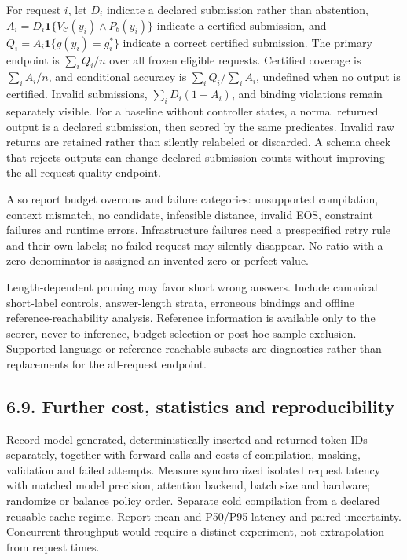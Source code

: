 \documentclass[
  12pt,
  a4paper,
]{article}
\begin{document}
For request $i$, let $D_i$ indicate a declared submission rather than abstention, $A_i=D_i\mathbf 1\{V_{\mathcal C}(y_i)\land P_b(y_i)\}$ indicate a certified submission, and $Q_i=A_i\mathbf 1\{g(y_i)=g_i^*\}$ indicate a correct certified submission. The primary endpoint is $\sum_i Q_i/n$ over all frozen eligible requests. Certified coverage is $\sum_i A_i/n$, and conditional accuracy is $\sum_i Q_i/\sum_i A_i$, undefined when no output is certified. Invalid submissions, $\sum_i D_i(1-A_i)$, and binding violations remain separately visible. For a baseline without controller states, a normal returned output is a declared submission, then scored by the same predicates. Invalid raw returns are retained rather than silently relabeled or discarded. A schema check that rejects outputs can change declared submission counts without improving the all-request quality endpoint.

Also report budget overruns and failure categories: unsupported compilation, context mismatch, no candidate, infeasible distance, invalid EOS, constraint failures and runtime errors. Infrastructure failures need a prespecified retry rule and their own labels; no failed request may silently disappear. No ratio with a zero denominator is assigned an invented zero or perfect value.

Length-dependent pruning may favor short wrong answers. Include canonical short-label controls, answer-length strata, erroneous bindings and offline reference-reachability analysis. Reference information is available only to the scorer, never to inference, budget selection or post hoc sample exclusion. Supported-language or reference-reachable subsets are diagnostics rather than replacements for the all-request endpoint.

\subsection{6.9. Further cost, statistics and reproducibility}

Record model-generated, deterministically inserted and returned token IDs separately, together with forward calls and costs of compilation, masking, validation and failed attempts. Measure synchronized isolated request latency with matched model precision, attention backend, batch size and hardware; randomize or balance policy order. Separate cold compilation from a declared reusable-cache regime. Report mean and P50/P95 latency and paired uncertainty. Concurrent throughput would require a distinct experiment, not extrapolation from request times.
\end{document}
